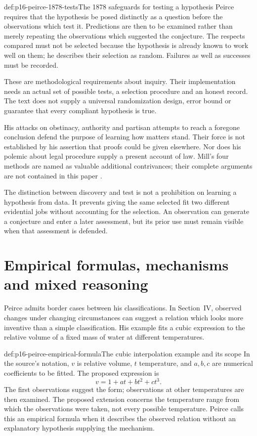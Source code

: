 \begin{hbmethod}{def:p16-peirce-1878-tests}{The 1878 safeguards for testing a hypothesis}
Peirce requires that the hypothesis be posed distinctly as a question
before the observations which test it. Predictions are then to be
examined rather than merely repeating the observations which suggested
the conjecture. The respects compared must not be selected because
the hypothesis is already known to work well on them; he describes
their selection as random. Failures as well as successes must be recorded.

These are methodological requirements about inquiry. Their implementation
needs an actual set of possible tests, a selection procedure and an honest
record. The text does not supply a universal randomization design, error
bound or guarantee that every compliant hypothesis is true.
\end{hbmethod}

His attacks on obstinacy, authority and partisan attempts to reach a
foregone conclusion defend the purpose of learning how matters stand.
Their force is not established by his assertion that proofs could be
given elsewhere. Nor does his polemic about legal procedure supply a
present account of law. Mill's four methods are named as valuable
additional contrivances; their complete arguments are not contained in
this paper \parencite[sec.~III]{Peirce1878DIHPrimary}.

The distinction between discovery and test is not a prohibition on
learning a hypothesis from data. It prevents giving the same selected
fit two different evidential jobs without accounting for the selection.
An observation can generate a conjecture and enter a later assessment,
but its prior use must remain visible when that assessment is defended.

\section{Empirical formulas, mechanisms and mixed reasoning}
\label{sec:p16-peirce-formula}

Peirce admits border cases between his classifications. In Section~IV,
observed changes under changing circumstances can suggest a relation
which looks more inventive than a simple classification. His example
fits a cubic expression to the relative volume of a fixed mass of water
at different temperatures.

\begin{hbexample}{def:p16-peirce-empirical-formula}{The cubic interpolation example and its scope}
In the source's notation, \(v\) is relative volume, \(t\) temperature,
and \(a,b,c\) are numerical coefficients to be fitted. The proposed
expression is
\[
                         v=1+at+bt^2+ct^3.
\]
The first observations suggest the form; observations at other temperatures
are then examined. The proposed extension concerns the temperature range
from which the observations were taken, not every possible temperature.
Peirce calls this an empirical formula when it describes the observed
relation without an explanatory hypothesis supplying the mechanism.
\end{hbexample}

